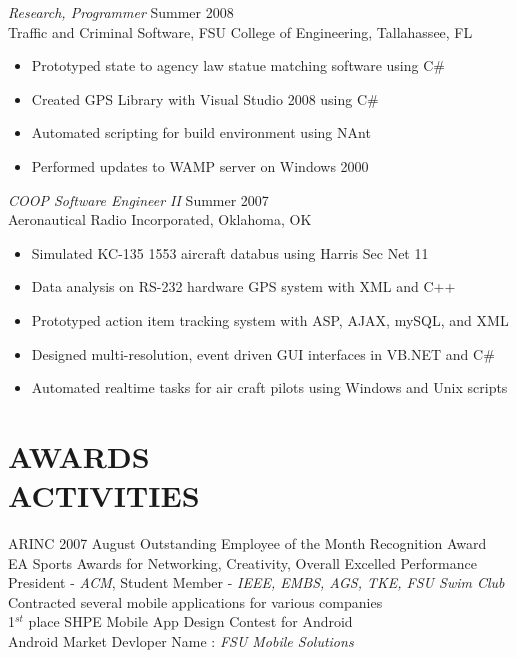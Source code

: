 \documentclass[margin]{res}
\begin{document}
\begin{resume}
{\sl Research, Programmer} \hfill            Summer 2008 \\
Traffic and Criminal Software, FSU College of Engineering, Tallahassee, FL
\begin{itemize}  \itemsep -2pt %
\item Prototyped state to agency law statue matching software using C\#
\item Created GPS Library with Visual Studio 2008 using C\#
\item Automated scripting for build environment using NAnt
\item Performed updates to WAMP server on Windows 2000
\end{itemize} 

{\sl COOP Software Engineer II} \hfill        Summer 2007 \\
Aeronautical Radio Incorporated, Oklahoma, OK
\begin{itemize} \itemsep -2pt %
\item Simulated KC-135 1553 aircraft databus using Harris Sec Net 11
\item Data analysis on RS-232 hardware GPS system with XML and C++
\item Prototyped action item tracking system with ASP, AJAX, mySQL, and XML
\item Designed multi-resolution, event driven GUI interfaces in VB.NET and C\#
\item Automated realtime tasks for air craft pilots using Windows and Unix scripts
\end{itemize} 
 
\section{AWARDS \\ ACTIVITIES}
ARINC 2007 August Outstanding Employee of the Month Recognition Award \\
EA Sports Awards for Networking, Creativity, Overall Excelled Performance\\
President - {\it ACM}, Student Member - {\it IEEE, EMBS, AGS, TKE, FSU Swim Club}\\
Contracted several mobile applications for various companies\\
1$^{st}$ place SHPE Mobile App Design Contest for Android\\
Android Market Devloper Name : \textit{FSU Mobile Solutions}



\end{resume}
\end{document}
